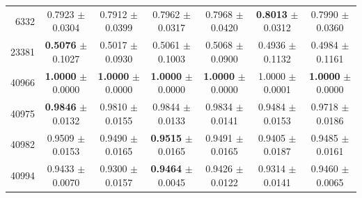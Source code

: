 \begin{table}[t]
\begin{tabular*}{\textwidth}{@{\extracolsep{\fill}}rcccccc@{}}
6332 & 0.7923 $\pm$ 0.0304 & 0.7912 $\pm$ 0.0399 & 0.7962 $\pm$ 0.0317 & 0.7968 $\pm$ 0.0420 & \textbf{0.8013} $\pm$ 0.0312 & 0.7990 $\pm$ 0.0360 \\
23381 & \textbf{0.5076} $\pm$ 0.1027 & 0.5017 $\pm$ 0.0930 & 0.5061 $\pm$ 0.1003 & 0.5068 $\pm$ 0.0900 & 0.4936 $\pm$ 0.1132 & 0.4984 $\pm$ 0.1161 \\
40966 & \textbf{1.0000} $\pm$ 0.0000 & \textbf{1.0000} $\pm$ 0.0000 & \textbf{1.0000} $\pm$ 0.0000 & \textbf{1.0000} $\pm$ 0.0000 & 1.0000 $\pm$ 0.0001 & \textbf{1.0000} $\pm$ 0.0000 \\
40975 & \textbf{0.9846} $\pm$ 0.0132 & 0.9810 $\pm$ 0.0155 & 0.9844 $\pm$ 0.0133 & 0.9834 $\pm$ 0.0141 & 0.9484 $\pm$ 0.0153 & 0.9718 $\pm$ 0.0186 \\
40982 & 0.9509 $\pm$ 0.0153 & 0.9490 $\pm$ 0.0165 & \textbf{0.9515} $\pm$ 0.0165 & 0.9491 $\pm$ 0.0165 & 0.9405 $\pm$ 0.0187 & 0.9485 $\pm$ 0.0161 \\
40994 & 0.9433 $\pm$ 0.0070 & 0.9300 $\pm$ 0.0157 & \textbf{0.9464} $\pm$ 0.0045 & 0.9426 $\pm$ 0.0122 & 0.9314 $\pm$ 0.0141 & 0.9460 $\pm$ 0.0065 \\
\bottomrule
\end{tabular*}
\label{tydra_AUROC}
\end{table}
